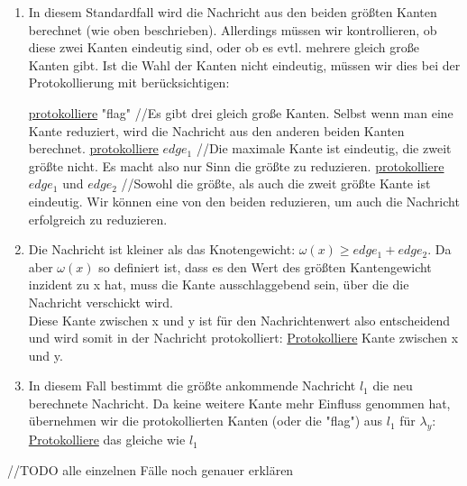 \begin{enumerate}[label=\alph*)]
	
	\item In diesem Standardfall wird die Nachricht aus den beiden größten Kanten berechnet (wie oben beschrieben). Allerdings müssen wir kontrollieren, ob diese zwei Kanten eindeutig sind, oder ob es evtl. mehrere gleich große Kanten gibt. Ist die Wahl der Kanten nicht eindeutig, müssen wir dies bei der Protokollierung mit berücksichtigen:\\
	
		\begin{algorithmic}
			\State \uline{protokolliere} "flag"
			\State//Es gibt drei gleich große Kanten. Selbst wenn man eine Kante reduziert, wird die Nachricht aus den anderen beiden Kanten berechnet.
			\State \uline{protokolliere} $edge_{1}$
			\State//Die maximale Kante ist eindeutig, die zweit größte nicht. Es macht also nur Sinn die größte zu reduzieren.
			\Else
			\State \uline{protokolliere} $edge_{1}$ und $edge_{2}$
			\State//Sowohl die größte, als auch die zweit größte Kante ist eindeutig. Wir können eine von den beiden reduzieren, um auch die Nachricht erfolgreich zu reduzieren.
			\EndIf
		\end{algorithmic}
	
	\item Die Nachricht ist kleiner als das Knotengewicht: $\omega(x) \geq edge_{1}+edge_{2}$. Da aber $\omega(x)$ so definiert ist, dass es den Wert des größten Kantengewicht inzident zu x hat, muss die Kante ausschlaggebend sein, über die die Nachricht verschickt wird. 
	\\
	Diese Kante zwischen x und y ist für den Nachrichtenwert also entscheidend und wird somit in der Nachricht protokolliert: \uline{Protokolliere} Kante zwischen x und y.
	
	\item In diesem Fall bestimmt die größte ankommende Nachricht $l_{1}$ die neu berechnete Nachricht. Da keine weitere Kante mehr Einfluss genommen hat, übernehmen wir die protokollierten Kanten (oder die "flag") aus $l_{1}$ für $\lambda_{y}$: \uline{Protokolliere} das gleiche wie $l_{1}$
	
\end{enumerate}

//TODO alle einzelnen Fälle noch genauer erklären
\\
\\

